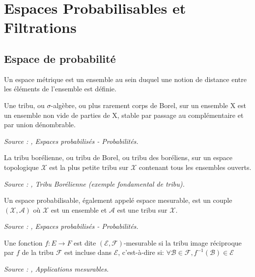 \section{Espaces Probabilisables et Filtrations}

\subsection{Espace de probabilité}

\begin{definition}\label{def:espace_metrique}
Un espace métrique est un ensemble au sein duquel une notion de distance entre les éléments de l'ensemble est définie.
\end{definition}

\begin{definition}\label{def:tribu}
Une tribu, ou $\sigma$-algèbre, ou plus rarement corps de Borel, sur un ensemble X est un ensemble non vide de parties de X, stable par passage au complémentaire et par union dénombrable.

\noindent\textit{Source : \cite{ensta_cours},  Espaces probabilisés - Probabilités.}

\end{definition}

\begin{definition}\label{def:tribu_borelienne}
La tribu borélienne, ou tribu de Borel, ou tribu des boréliens, sur un espace topologique $\mathcal{X}$ est la plus petite tribu sur $\mathcal{X}$ contenant tous les ensembles ouverts.

\noindent\textit{Source : \cite{cours_integrations}, Tribu Borélienne (exemple fondamental de tribu).}
\end{definition}

\begin{definition}\label{def:espace_probabilisable}
Un espace probabilisable, également appelé espace mesurable, est un couple $(\mathcal{X}, \mathcal{A})$ où $\mathcal{X}$ est un ensemble et $\mathcal{A}$ est une tribu sur $\mathcal{X}$.

\noindent\textit{Source : \cite{ensta_cours},  Espaces probabilisés - Probabilités.}
\end{definition}

\begin{definition}\label{def:fonction_mesurable}
Une fonction $f:E \rightarrow F$ est dite $(\mathcal{E}, \mathcal{F})$-mesurable si la tribu image réciproque par $f$ de la tribu $\mathcal{F}$ 
est incluse dans $\mathcal{E}$, c'est-à-dire si:
$\forall \mathcal{B} \in \mathcal{F}, f^{-1}(\mathcal{B}) \in \mathcal{E}$

\noindent\textit{Source : \cite{cours_integrations},  Applications mesurables.}
\end{definition}

